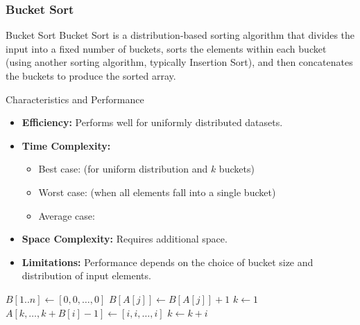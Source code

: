 \newpage
\subsubsection{Bucket Sort}
\begin{definition}[]{Bucket Sort}
    Bucket Sort is a distribution-based sorting algorithm that divides the input into a fixed number of buckets, sorts the elements within each bucket (using another sorting algorithm, typically Insertion Sort), and then concatenates the buckets to produce the sorted array.
\end{definition}

\begin{properties}[]{Characteristics and Performance}
    \begin{itemize}
        \item \textbf{Efficiency:} Performs well for uniformly distributed datasets.
        \item \textbf{Time Complexity:}
              \begin{itemize}
                  \item Best case:  (for uniform distribution and $k$ buckets)
                  \item Worst case:  (when all elements fall into a single bucket)
                  \item Average case: 
              \end{itemize}
        \item \textbf{Space Complexity:} Requires  additional space.
        \item \textbf{Limitations:} Performance depends on the choice of bucket size and distribution of input elements.
    \end{itemize}
\end{properties}

\begin{algorithm}
    \begin{spacing}{1.2}
        \caption{Bucket Sort}
        \begin{algorithmic}[1]
                \State $B[1..n] \gets [0, 0, \ldots, 0]$
                    \State $B[A[j]] \gets B[A[j]] + 1$ 
                \EndFor
                \State $k \gets 1$
                    \State $A[k, \ldots, k + B[i] - 1] \gets [i, i, \ldots, i]$ 
                    \State $k \gets k + i$ 
                \EndFor
            \EndProcedure
        \end{algorithmic}
    \end{spacing}
\end{algorithm}


